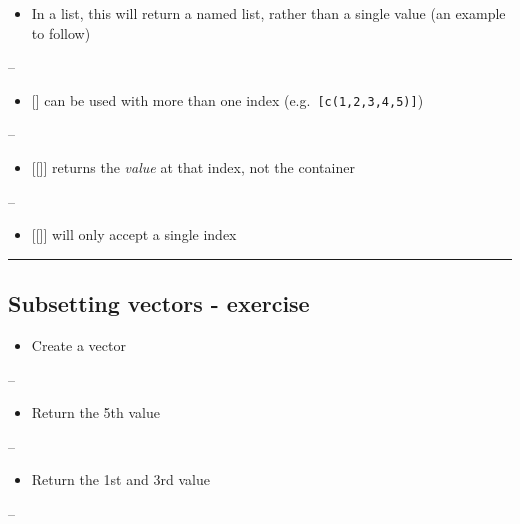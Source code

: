 \documentclass[]{article}
\providecommand{\tightlist}{%
  \setlength{\itemsep}{0pt}\setlength{\parskip}{0pt}}
\begin{document}
\begin{itemize}
\tightlist
\item
  In a list, this will return a named list, rather than a single value
  (an example to follow)
\end{itemize}

--

\begin{itemize}
\tightlist
\item
  {[}{]} can be used with more than one index
  (e.g.~\texttt{{[}c(1,2,3,4,5){]}})
\end{itemize}

--

\begin{itemize}
\tightlist
\item
  {[}{[}{]}{]} returns the \emph{value} at that index, not the container
\end{itemize}

--

\begin{itemize}
\tightlist
\item
  {[}{[}{]}{]} will only accept a single index
\end{itemize}

\begin{center}\rule{0.5\linewidth}{\linethickness}\end{center}

\hypertarget{subsetting-vectors---exercise}{%
\subsection{Subsetting vectors -
exercise}\label{subsetting-vectors---exercise}}

\begin{itemize}
\tightlist
\item
  Create a vector
\end{itemize}

--

\begin{itemize}
\tightlist
\item
  Return the 5th value
\end{itemize}

--

\begin{itemize}
\tightlist
\item
  Return the 1st and 3rd value
\end{itemize}

--
\end{document}
